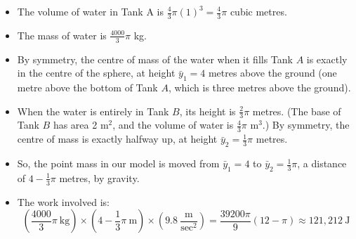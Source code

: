\begin{solution}
\begin{itemize}
\item
The volume of water in Tank A is $\frac{4}{3}\pi(1)^3 = \frac{4}{3}\pi$ cubic metres.
\item The mass of water is $\frac{4000}{3}\pi$ kg.
\item By symmetry, the centre of mass of the water when it fills Tank $A$ is exactly in the centre of the sphere, at height $\bar y_1=4$ metres above the ground (one metre above the bottom of Tank $A$, which is three metres above the ground).
\item When the water is entirely in Tank $B$, its height is $\frac{2}{3}\pi$ metres. (The base of Tank $B$ has area 2 m$^2$, and the volume of water is $\frac{4}{3}\pi$ m$^3$.) By symmetry, the centre of mass is exactly halfway up, at height $\bar y_2=\frac{1}{3}\pi$ metres.
\item So, the point mass in our model is moved from $\bar y_1=4$ to $\bar y_2=\frac{1}{3}\pi$, a distance of $4-\frac{1}{3}\pi$ metres, by gravity.
\item The work involved is:
\[\left(\frac{4000}{3}\pi~\text{kg}\right)\times\left(4-\frac{1}{3}\pi~\text{m}\right)\times\left(9.8~\frac{\text{m}}{\text{sec}^2}\right) = \frac{39200\pi}{9}(12-\pi)\approx 121,212~\text{J}\]
\end{itemize}
\end{solution}

